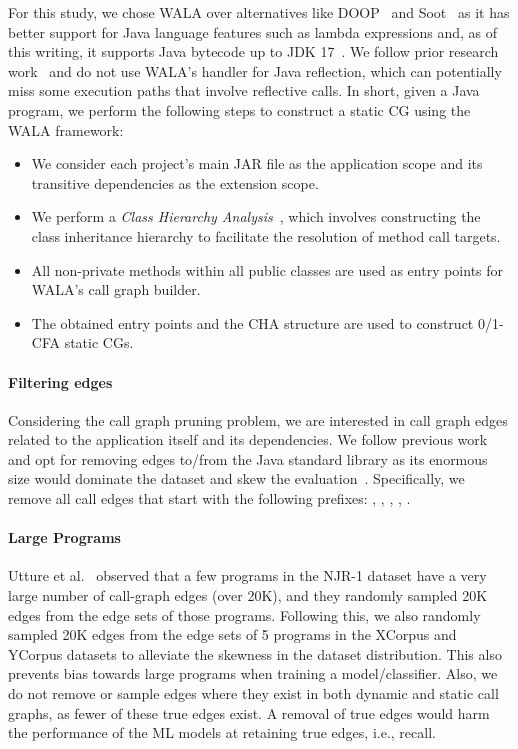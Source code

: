 For this study, we chose WALA over alternatives like DOOP~\cite{smaragdakis2021doop} and Soot~\cite{vallee2010soot} as it has better support for Java language features such as lambda expressions and, as of this writing, it supports Java bytecode up to JDK 17~\cite{wala}. We follow prior research work~\cite{utture2022striking, le2022autopruner} and do not use WALA's handler for Java reflection, which can potentially miss some execution paths that involve reflective calls. In short, given a Java program, we perform the following steps to construct a static CG using the WALA framework:

\begin{itemize}
    \item We consider each project's main JAR file as the application scope and its transitive dependencies as the extension scope.
    \item We perform a \emph{Class Hierarchy Analysis}~\cite{dean1995optimization}, which involves constructing the class inheritance hierarchy to facilitate the resolution of method call targets.
    \item All non-private methods within all public classes are used as entry points for WALA's call graph builder.
    \item The obtained entry points and the CHA structure are used to construct 0/1-CFA static CGs.
\end{itemize}

\paragraph{Filtering edges} Considering the call graph pruning problem, we are interested in call graph edges related to the application itself and its dependencies.
We follow previous work and opt for removing edges to/from the Java standard library as its enormous size would dominate the dataset and skew the evaluation~\cite{utture2022striking}.
Specifically, we remove all call edges that start with the following prefixes: 
, , , , .

\paragraph{Large Programs} Utture et al.~\cite{utture2022striking} observed that a few programs in the NJR-1 dataset have a very large number of call-graph edges (over 20K), and they randomly sampled 20K edges from the edge sets of those programs. Following this, we also randomly sampled 20K edges from the edge sets of 5 programs in the XCorpus and YCorpus datasets to alleviate the skewness in the dataset distribution. This also prevents bias towards large programs when training a model/classifier. Also, we do not remove or sample edges where they exist in both dynamic and static call graphs, as fewer of these true edges exist.
A removal of true edges would harm the performance of the ML models at retaining true edges, i.e., recall.


